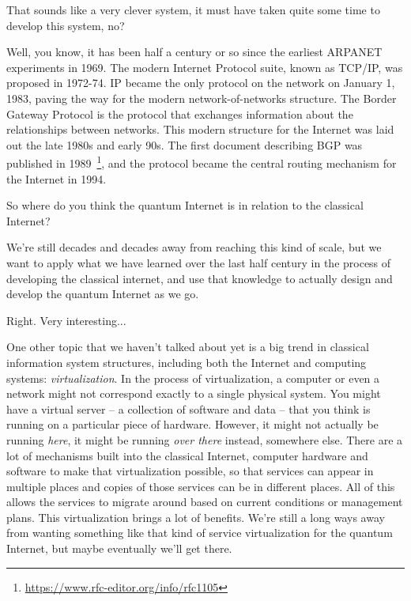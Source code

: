 \mmm That sounds like a very clever system, it must have taken quite some time to develop this system, no?

\rrr Well, you know, it has been half a century or so since the earliest ARPANET experiments in 1969.  
The modern Internet Protocol suite, known as TCP/IP, was proposed in 1972-74. IP became the only protocol on the network on January 1, 1983, paving the way for the modern network-of-networks structure. 
The Border Gateway Protocol is the protocol that exchanges information about the relationships between networks. This modern structure for the Internet was laid out the late 1980s and early 90s. The first document describing BGP was published in 1989~\footnote{\url{https://www.rfc-editor.org/info/rfc1105}}, and the protocol became the central routing mechanism for the Internet in 1994.

\mmm So where do you think the quantum Internet is in relation to the classical Internet?

\rrr We're still decades and decades away from reaching this kind of scale, but we want to apply what we have learned over the last half century in the process of developing the classical internet, and use that knowledge to actually design and develop the quantum Internet as we go.

\mmm Right. Very interesting...

\rrr One other topic that we haven't talked about yet is a big trend in classical information system structures, including both the Internet and computing systems: \emph{virtualization}. In the process of virtualization, a computer or even a network might not correspond exactly to a single physical system. You might have a virtual server -- a collection of software and data -- that you think is running on a particular piece of hardware.  However, it might not actually be running \emph{here}, it might be running \emph{over there} instead, somewhere else. There are a lot of mechanisms built into the classical Internet, computer hardware and software to make that virtualization possible, so that services can appear in multiple places and copies of those services can be in different places. All of this allows the services to migrate around based on current conditions or management plans. This virtualization brings a lot of benefits. We're still a long ways away from wanting something like that kind of service virtualization for the quantum Internet, but maybe eventually we'll get there.

